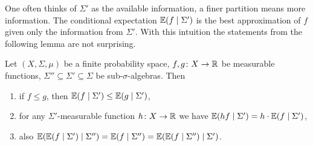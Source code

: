 		
One often thinks of $\Sigma'$ as the available information, a finer partition means more information. The conditional expectation $\mathbb{E}(f\mid \Sigma')$ is the best approximation of $f$ given only the information from $\Sigma'$. 
With this intuition the statements from the following lemma are not surprising. 
\begin{lemma}\label{lem:condExp}
	Let $(X,\Sigma,\mu)$ be a finite probability space, $f,g\colon X\to \mathbb{R}$ be measurable functions, $\Sigma''\subseteq\Sigma'\subseteq\Sigma$ be sub-$\sigma$-algebras. Then
	\begin{enumerate}[label=\roman*)]
		\item if $f\leq g$, then $\mathbb{E}(f\mid \Sigma')\leq\mathbb{E}(g\mid \Sigma')$,
		\item for any $\Sigma'$-measurable function $h\colon X\to\mathbb{R}$ we have $\mathbb{E}(h f\mid\Sigma')=h\cdot\mathbb{E}(f\mid\Sigma')$,
		\item also $\mathbb{E}(\mathbb{E}(f\mid \Sigma')\mid\Sigma'')=\mathbb{E}(f\mid\Sigma'')=\mathbb{E}(\mathbb{E}(f\mid \Sigma'')\mid\Sigma')$.
	\end{enumerate}
\end{lemma}
